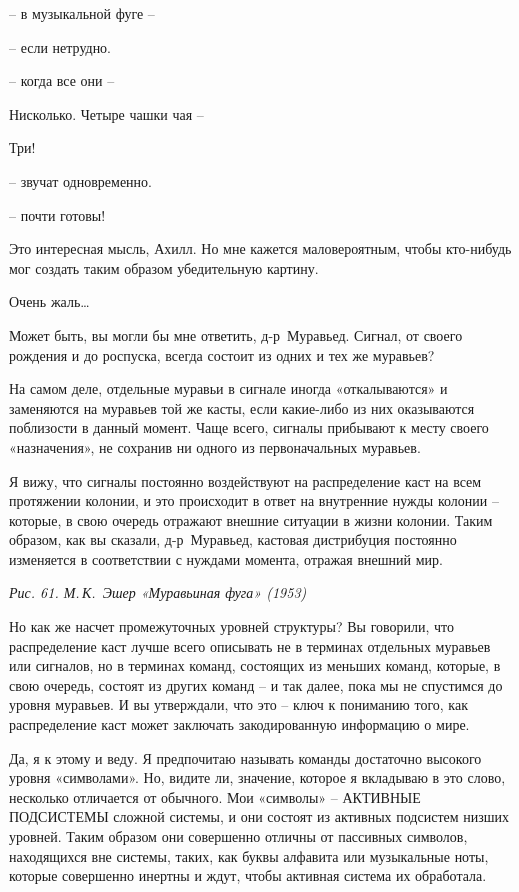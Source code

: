 \documentclass[../main.tex]{subfiles}
\begin{document}
\begin{dialogue}
 \--- в музыкальной фуге \---

 \--- если нетрудно.

 \--- когда все они \---

 Нисколько. Четыре чашки чая \---

 Три!

 \--- звучат одновременно.

 \--- почти готовы!

 Это интересная мысль, Ахилл. Но мне кажется маловероятным, чтобы кто-нибудь мог создать таким образом убедительную картину.

 Очень жаль\ldots{}

 Может быть, вы могли бы мне ответить, д-р~Муравьед. Сигнал, от своего рождения и до роспуска, всегда состоит из одних и тех же муравьев?

 На самом деле, отдельные муравьи в сигнале иногда «откалываются» и заменяются на муравьев той же касты, если какие-либо из них оказываются поблизости в данный момент. Чаще всего, сигналы прибывают к месту своего «назначения», не сохранив ни одного из первоначальных муравьев.

 Я вижу, что сигналы постоянно воздействуют на распределение каст на всем протяжении колонии, и это происходит в ответ на внутренние нужды колонии \--- которые, в свою очередь отражают внешние ситуации в жизни колонии. Таким образом, как вы сказали, д-р~Муравьед, кастовая дистрибуция постоянно изменяется в соответствии с нуждами момента, отражая внешний мир.

\emph{Рис. 61. М.\,К.~Эшер «Муравьиная фуга» (1953)}

 Но как же насчет промежуточных уровней структуры? Вы говорили, что распределение каст лучше всего описывать не в терминах отдельных муравьев или сигналов, но в терминах команд, состоящих из меньших команд, которые, в свою очередь, состоят из других команд \--- и так далее, пока мы не спустимся до уровня муравьев. И вы утверждали, что это \--- ключ к пониманию того, как распределение каст может заключать закодированную информацию о мире.

 Да, я к этому и веду. Я предпочитаю называть команды достаточно высокого уровня «символами». Но, видите ли, значение, которое я вкладываю в это слово, несколько отличается от обычного. Мои «символы» \--- АКТИВНЫЕ ПОДСИСТЕМЫ сложной системы, и они состоят из активных подсистем низших уровней. Таким образом они совершенно отличны от пассивных символов, находящихся вне системы, таких, как буквы алфавита или музыкальные ноты, которые совершенно инертны и ждут, чтобы активная система их обработала.


\end{dialogue}
\end{document}
